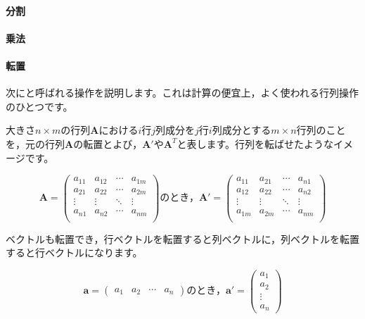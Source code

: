 \documentclass{ltjsbook}
\begin{document}
\paragraph{分割}




\paragraph{乗法}







\paragraph{転置}
次にと呼ばれる操作を説明します。これは計算の便宜上，よく使われる行列操作のひとつです。

大きさ$n \times m$の行列$\bm{A}$における$i$行$j$列成分を$j$行$i$列成分とする$m \times n$行列のことを，元の行列$\bm{A}$の転置とよび，$\bm{A}'$や$\bm{A}^T$と表します。行列を転ばせたようなイメージです。

\begin{equation*}
    \bm{A}=
    \begin{pmatrix}
        a_{11} & a_{12} & \cdots & a_{1m} \\
        a_{21} & a_{22} & \cdots & a_{2m} \\
        \vdots & \vdots & \ddots & \vdots \\
        a_{n1} & a_{n2} & \cdots & a_{nm} \\
    \end{pmatrix}
    \mbox{のとき，}
    \bm{A}'=
    \begin{pmatrix}
        a_{11} & a_{21} & \cdots & a_{n1} \\
        a_{12} & a_{22} & \cdots & a_{n2} \\
        \vdots & \vdots & \ddots & \vdots \\
        a_{1m} & a_{2m} & \cdots & a_{nm} \\
    \end{pmatrix}
\end{equation*}


ベクトルも転置でき，行ベクトルを転置すると列ベクトルに，列ベクトルを転置すると行ベクトルになります。

\begin{equation*}
    \bm{a} =
    \begin{pmatrix}
        a_1 & a_2 & \cdots & a_n
    \end{pmatrix}
    \mbox{のとき，}
    \bm{a}'=
    \begin{pmatrix}
        a_1    \\
        a_2    \\
        \vdots \\
        a_n
    \end{pmatrix}
\end{equation*}
\end{document}
